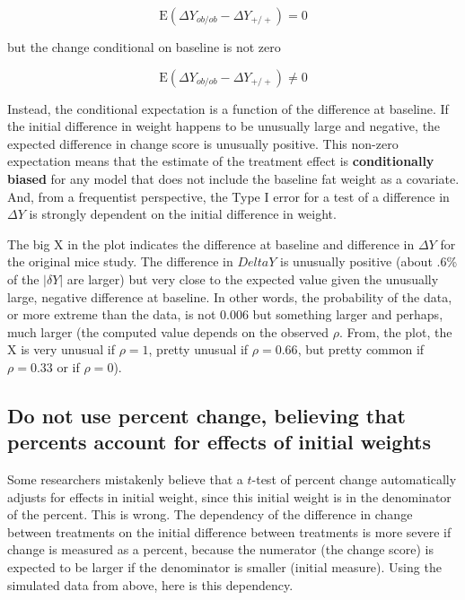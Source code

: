 \documentclass[]{book}
\begin{document}
\begin{equation}
\mathrm{E}(\Delta Y_{ob/ob} - \Delta Y_{+/+}) = 0
\end{equation}

but the change conditional on baseline is not zero

\begin{equation}
\mathrm{E}(\Delta Y_{ob/ob} - \Delta Y_{+/+}) \ne 0
\end{equation}

Instead, the conditional expectation is a function of the difference at
baseline. If the initial difference in weight happens to be unusually
large and negative, the expected difference in change score is unusually
positive. This non-zero expectation means that the estimate of the
treatment effect is \textbf{conditionally biased} for any model that
does not include the baseline fat weight as a covariate. And, from a
frequentist perspective, the Type I error for a test of a difference in
\(\Delta Y\) is strongly dependent on the initial difference in weight.

The big X in the plot indicates the difference at baseline and
difference in \(\Delta Y\) for the original mice study. The difference
in \(Delta Y\) is unusually positive (about .6\% of the \(|\delta Y|\)
are larger) but very close to the expected value given the unusually
large, negative difference at baseline. In other words, the probability
of the data, or more extreme than the data, is not 0.006 but something
larger and perhaps, much larger (the computed value depends on the
observed \(\rho\). From, the plot, the X is very unusual if \(\rho=1\),
pretty unusual if \(\rho=0.66\), but pretty common if \(\rho=0.33\) or
if \(\rho=0\)).

\subsection{Do not use percent change, believing that percents account
for effects of initial
weights}\label{do-not-use-percent-change-believing-that-percents-account-for-effects-of-initial-weights}

Some researchers mistakenly believe that a \(t\)-test of percent change
automatically adjusts for effects in initial weight, since this initial
weight is in the denominator of the percent. This is wrong. The
dependency of the difference in change between treatments on the initial
difference between treatments is more severe if change is measured as a
percent, because the numerator (the change score) is expected to be
larger if the denominator is smaller (initial measure). Using the
simulated data from above, here is this dependency.
\end{document}
